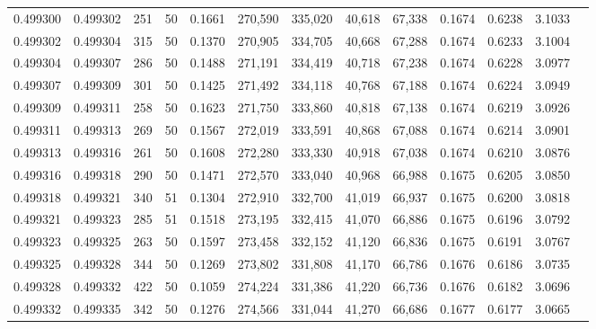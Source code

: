 \begin{tabular}{rrrrrrrrrrrrr}
0.499300 & 0.499302 & 251 &  50 &                                     0.1661 & 270,590 & 335,020 &  40,618 &  67,338 & 0.1674 & 0.6238 & 3.1033 \\
0.499302 & 0.499304 & 315 &  50 &                                     0.1370 & 270,905 & 334,705 &  40,668 &  67,288 & 0.1674 & 0.6233 & 3.1004 \\
0.499304 & 0.499307 & 286 &  50 &                                     0.1488 & 271,191 & 334,419 &  40,718 &  67,238 & 0.1674 & 0.6228 & 3.0977 \\
0.499307 & 0.499309 & 301 &  50 &                                     0.1425 & 271,492 & 334,118 &  40,768 &  67,188 & 0.1674 & 0.6224 & 3.0949 \\
0.499309 & 0.499311 & 258 &  50 &                                     0.1623 & 271,750 & 333,860 &  40,818 &  67,138 & 0.1674 & 0.6219 & 3.0926 \\
0.499311 & 0.499313 & 269 &  50 &                                     0.1567 & 272,019 & 333,591 &  40,868 &  67,088 & 0.1674 & 0.6214 & 3.0901 \\
0.499313 & 0.499316 & 261 &  50 &                                     0.1608 & 272,280 & 333,330 &  40,918 &  67,038 & 0.1674 & 0.6210 & 3.0876 \\
0.499316 & 0.499318 & 290 &  50 &                                     0.1471 & 272,570 & 333,040 &  40,968 &  66,988 & 0.1675 & 0.6205 & 3.0850 \\
0.499318 & 0.499321 & 340 &  51 &                                     0.1304 & 272,910 & 332,700 &  41,019 &  66,937 & 0.1675 & 0.6200 & 3.0818 \\
0.499321 & 0.499323 & 285 &  51 &                                     0.1518 & 273,195 & 332,415 &  41,070 &  66,886 & 0.1675 & 0.6196 & 3.0792 \\
0.499323 & 0.499325 & 263 &  50 &                                     0.1597 & 273,458 & 332,152 &  41,120 &  66,836 & 0.1675 & 0.6191 & 3.0767 \\
0.499325 & 0.499328 & 344 &  50 &                                     0.1269 & 273,802 & 331,808 &  41,170 &  66,786 & 0.1676 & 0.6186 & 3.0735 \\
0.499328 & 0.499332 & 422 &  50 &                                     0.1059 & 274,224 & 331,386 &  41,220 &  66,736 & 0.1676 & 0.6182 & 3.0696 \\
0.499332 & 0.499335 & 342 &  50 &                                     0.1276 & 274,566 & 331,044 &  41,270 &  66,686 & 0.1677 & 0.6177 & 3.0665 \\

\end{tabular}
